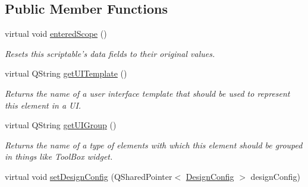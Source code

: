 \subsection*{Public Member Functions}
\begin{DoxyCompactItemize}
\item 
virtual void \hyperlink{class_picto_1_1_analysis_output_abbe842b6e1021e719ebe7f6aeab6179c}{entered\-Scope} ()
\begin{DoxyCompactList}\small\item\em Resets this scriptable's data fields to their original values. \end{DoxyCompactList}\item 
\hypertarget{class_picto_1_1_analysis_output_a2623ba4c391e1133a12ea4d1559fad10}{virtual Q\-String \hyperlink{class_picto_1_1_analysis_output_a2623ba4c391e1133a12ea4d1559fad10}{get\-U\-I\-Template} ()}\label{class_picto_1_1_analysis_output_a2623ba4c391e1133a12ea4d1559fad10}

\begin{DoxyCompactList}\small\item\em Returns the name of a user interface template that should be used to represent this element in a U\-I. \end{DoxyCompactList}\item 
\hypertarget{class_picto_1_1_analysis_output_a24bd92d046d3ee70d5cd5fb77dfc351e}{virtual Q\-String \hyperlink{class_picto_1_1_analysis_output_a24bd92d046d3ee70d5cd5fb77dfc351e}{get\-U\-I\-Group} ()}\label{class_picto_1_1_analysis_output_a24bd92d046d3ee70d5cd5fb77dfc351e}

\begin{DoxyCompactList}\small\item\em Returns the name of a type of elements with which this element should be grouped in things like Tool\-Box widget. \end{DoxyCompactList}\item 
\hypertarget{class_picto_1_1_analysis_output_a068aed3428378e4e910b586ded987902}{virtual void \hyperlink{class_picto_1_1_analysis_output_a068aed3428378e4e910b586ded987902}{set\-Design\-Config} (Q\-Shared\-Pointer$<$ \hyperlink{class_picto_1_1_design_config}{Design\-Config} $>$ design\-Config)}\label{class_picto_1_1_analysis_output_a068aed3428378e4e910b586ded987902}


\end{DoxyCompactItemize}
